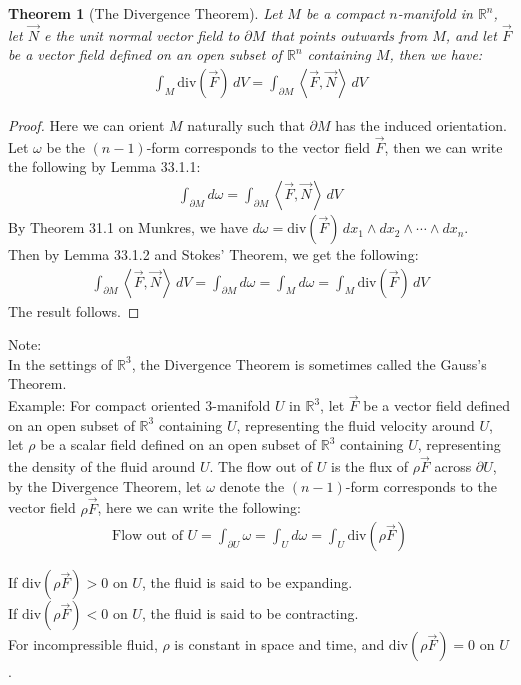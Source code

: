 \documentclass[15pt]{book}
\theoremstyle{break}
\theoremstyle{break}
\newtheorem{thm}{Theorem}[section]
\newcommand{\R}{\mathbb{R}}
\newcommand{\note}{\color{red}Note: \color{black}}
\newcommand{\example}{\color{green}Example: \color{black}}
\begin{document}
\begin{thm}[The Divergence Theorem]
Let $M$ be a compact $n$-manifold in $\R^n$, let $\vec{N}$ e the unit normal vector field to $\partial M$ that points outwards from $M$, and let $\vec{F}$ be a vector field defined on an open subset of $\R^n$ containing $M$, then we have:
\begin{align*}
\int_M \text{div}(\vec{F}) \, dV = \int_{\partial M}\left< \vec{F}, \vec{N}\right> \, dV
\end{align*}
\end{thm}
\begin{proof}
Here we can orient $M$ naturally such that $\partial M$ has the induced orientation. Let $\omega$ be the $(n-1)$-form corresponds to the vector field $\vec{F}$, then we can write the following by Lemma 33.1.1:
\begin{align*}
\int_{\partial M} d\omega = \int_{\partial M} \left< \vec{F}, \vec{N}\right> \, dV
\end{align*}
By Theorem 31.1 on Munkres, we have $d\omega = \text{div}(\vec{F})\, dx_1 \wedge dx_2 \wedge \cdots \wedge dx_n$. \\
Then by Lemma 33.1.2 and Stokes' Theorem, we get the following:
\begin{align*}
\int_{\partial M} \left< \vec{F}, \vec{N}\right> \, dV =\int_{\partial M} d\omega= \int_M d\omega = \int_M \text{div}(\vec{F}) \, dV
\end{align*}
The result follows.
\end{proof}
\note \\
In the settings of $\R^3$, the Divergence Theorem is sometimes called the Gauss's Theorem.\\

\example For compact oriented $3$-manifold $U$ in $\R^3$, let $\vec{F}$ be a vector field defined on an open subset of $\R^3$ containing $U$, representing the fluid velocity around $U$, let $\rho$ be a scalar field defined on an open subset of $\R^3$ containing $U$, representing the density of the fluid around $U$. The flow out of $U$ is the flux of $\rho \vec{F}$ across $\partial U$, by the Divergence Theorem, let $\omega$ denote the $(n-1)$-form corresponds to the vector field $\rho \vec{F}$, here we can write the following:
\begin{align*}
\text{Flow out of }U = \int_{\partial U}\omega = \int_U d\omega = \int_U \text{div}(\rho \vec{F})
\end{align*}

If $\text{div}(\rho \vec{F})>0$ on $U$, the fluid is said to be expanding. \\
If $\text{div}(\rho \vec{F})<0$ on $U$, the fluid is said to be contracting.\\
For incompressible fluid, $\rho$ is constant in space and time, and $\text{div}(\rho \vec{F})  =0$ on $U$.\\
\newpage
\end{document}
